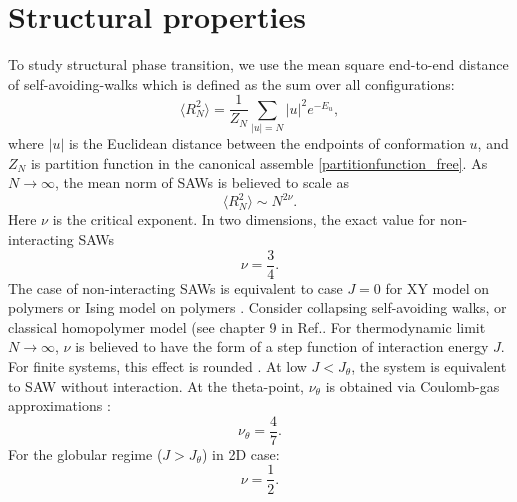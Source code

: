\section{Structural properties} 
To study structural phase transition, we use the mean square end-to-end distance of self-avoiding-walks which is defined as the sum over all configurations:
\begin{equation}
\label{endtoend}
\langle R_N^2 \rangle  =  \frac{1}{Z_N} \sum_{ |u|=N }  |u|^2 e^{-E_u},
\end{equation}
where $|u|$ is the Euclidean distance between the endpoints of conformation $u$, and $Z_N$ is partition function in the canonical assemble \eqref{partitionfunction_free}. As $N \rightarrow \infty $, the mean norm of SAWs is believed to scale as 
\begin{equation}
\label{r_scale}
\langle R_N^2 \rangle \sim N^{2 \nu }.
\end{equation}
Here ${\nu} $ is the critical exponent. In two dimensions, the exact value for non-interacting SAWs \cite{Li1995}
\begin{equation}
\label{nur}
\nu = \frac{3}{4}. 
\end{equation}
The case of non-interacting SAWs is equivalent to case $J=0$ for XY model on polymers or Ising model on polymers   \cite{PhysRevE.104.054501}.  
Consider collapsing self-avoiding walks, or classical homopolymer model (see chapter 9 in Ref.\cite{van2015statistical}. For thermodynamic limit $N \rightarrow \infty $, $\nu$ is believed to have the form of a step function of interaction energy $J$. For finite systems, this effect is rounded \cite{vanderzande1998lattice}. At low $J < J_{\theta}$, the system is equivalent to SAW without interaction. At the theta-point, $\nu_{\theta}$  is obtained via Coulomb-gas approximations \cite{Duplantier1987}:
\begin{equation}
\label{nu_theta}
\nu_{\theta} = \frac{4}{7}.
\end{equation}  
For the globular regime ($J > J_{\theta}$) in 2D case:
\begin{equation}
\label{globular}
\nu = \frac{1}{2}.
\end{equation} 
